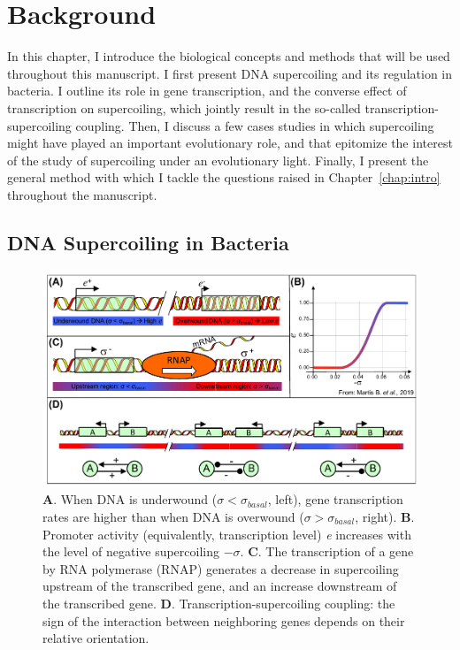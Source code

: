 \chapter{Background}
\label{chap:background}

In this chapter, I introduce the biological concepts and methods that will be used throughout this manuscript.
I first present DNA supercoiling and its regulation in bacteria.
I outline its role in gene transcription, and the converse effect of transcription on supercoiling, which jointly result in the so-called transcription-supercoiling coupling.
Then, I discuss a few cases studies in which supercoiling might have played an important evolutionary role, and that epitomize the interest of the study of supercoiling under an evolutionary light.
Finally, I present the general method with which I tackle the questions raised in Chapter~\ref{chap:intro} throughout the manuscript.

\section{DNA Supercoiling in Bacteria}
\label{sec:background:sc}

\begin{figure}
  \centering
  \includegraphics[width=\textwidth]{alife/img/fig-theorique.pdf}
  \caption[Role of supercoiling in transcription, and description of the TSC]{\textbf{A}. When DNA is underwound ($\sigma < \sigma_{basal}$, left), gene transcription rates are higher than when DNA is overwound ($\sigma > \sigma_{basal}$, right).
  \textbf{B}. Promoter activity (equivalently, transcription level) \emph{e} increases with the level of negative supercoiling $-\sigma$.
  \textbf{C}. The transcription of a gene by RNA polymerase (RNAP) generates a decrease in supercoiling upstream of the transcribed gene, and an increase downstream of the transcribed gene.
  \textbf{D}. Transcription-supercoiling coupling: the sign of the interaction between neighboring genes depends on their relative orientation.}
  \label{fig:background:theory}
\end{figure}

